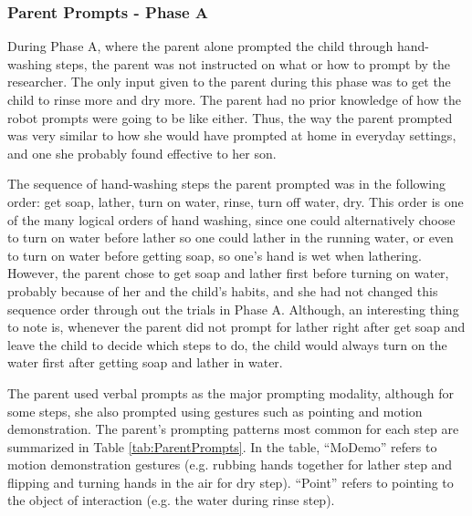 \subsubsection{Parent Prompts - Phase A}
During Phase A, where the parent alone prompted the child through hand-washing steps, the parent was not instructed on what or how to prompt by the researcher.  The only input given to the parent during this phase was to get the child to rinse more and dry more.  The parent had no prior knowledge of how the robot prompts were going to be like either.  Thus, the way the parent prompted was very similar to how she would have prompted at home in everyday settings, and one she probably found effective to her son.

The sequence of hand-washing steps the parent prompted was in the following order: get soap, lather, turn on water, rinse, turn off water, dry.  This order is one of the many logical orders of hand washing, since one could alternatively choose to turn on water before lather so one could lather in the running water, or even to turn on water before getting soap, so one's hand is wet when lathering.  However, the parent chose to get soap and lather first before turning on water, probably because of her and the child's habits, and she had not changed this sequence order through out the trials in Phase A.  Although, an interesting thing to note is, whenever the parent did not prompt for lather right after get soap and leave the child to decide which steps to do, the child would always turn on the water first after getting soap and lather in water.

The parent used verbal prompts as the major prompting modality, although for some steps, she also prompted using gestures such as pointing and motion demonstration.  The parent's prompting patterns most common for each step are summarized in Table \ref{tab:ParentPrompts}.  In the table, ``MoDemo'' refers to motion demonstration gestures (e.g. rubbing hands together for lather step and flipping and turning hands in the air for dry step).  ``Point'' refers to pointing to the object of interaction (e.g. the water during rinse step).

